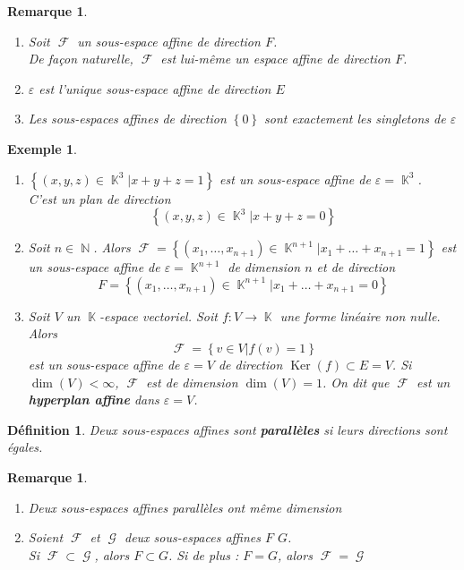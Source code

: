 \documentclass[a4paper, oneside]{report}
\theoremstyle{break}
\newtheorem{definition}[thm]{Définition}
\newtheorem{exemple}[thm]{Exemple}
\newtheorem{remarque}[thm]{Remarque}
\DeclareMathOperator{\N}{\mathbb{N}}
\DeclareMathOperator{\K}{\mathbb{K}}
\DeclareMathOperator{\F}{\mathcal{F}}
\DeclareMathOperator{\G}{\mathcal{G}}
\DeclarePairedDelimiter\ens{\left\{ }{\right\} }%
\DeclareMathOperator{\Ker}{Ker}
\renewcommand{\ens}[1]{\left\{ #1 \right\} }%
\newcommand{\slign}{\textbf}
\newcommand{\Ens}{\ens}
\newcommand{\ensF}{\F}
\newcommand{\ensG}{\G}
\begin{document}
\begin{remarque}
\begin{enumerate}
\item Soit $\ensF$ un sous-espace affine de direction $F$.\\
De façon naturelle, $\ensF$ est lui-même un espace affine de direction $F$.

\medbreak

\item $\varepsilon$ est l'unique sous-espace affine de direction $E$

\medbreak

\item  Les sous-espaces affines de direction $\ens{0}$ sont exactement les singletons de $\varepsilon$
\end{enumerate}
\end{remarque}

\begin{exemple}
\begin{enumerate}
\item  $\Ens{(x, y, z) \in \K^3 \big| x + y + z = 1}$ est un sous-espace affine de $\varepsilon = \K^3$.\\
C'est un plan de direction
\[
\Ens{(x, y, z) \in \K^3 \big| x + y + z = 0}
\]

\item  Soit $n \in \N$. Alors $\ensF = \Ens{(x_1, \ldots, x_{n+1}) \in \K^{n+1} \big| x_1 + \ldots + x_{n+1} = 1}$ est un sous-espace affine de $\varepsilon = \K^{n+1}$ de dimension $n$ et de direction
\[
F = \Ens{(x_1, \ldots, x_{n+1}) \in \K^{n+1} \big| x_1 + \ldots + x_{n+1} = 0}
\]

\item  Soit $V$ un $\K$-espace vectoriel. Soit $f : V \longrightarrow \K$ une forme linéaire non nulle. Alors
\[
\ensF = \Ens{v \in V \big| f(v) = 1}
\]
est un sous-espace affine de $\varepsilon = V$ de direction $\Ker(f) \subset E = V$. Si $\dim(V) < \infty$, $\ensF$ est de dimension $\dim(V) = 1$. On dit que $\ensF$ est un \slign{hyperplan affine} dans $\varepsilon = V$.

\end{enumerate}
\end{exemple}

\begin{definition}
Deux sous-espaces affines sont \slign{parallèles} si leurs directions sont égales.
\end{definition}

\begin{remarque}
\begin{enumerate}
\item  Deux sous-espaces affines parallèles ont même dimension

\medbreak

\item  Soient $\ensF$ et $\ensG$ deux sous-espaces affines $F$ $G$.\\
Si $\ensF \subset \ensG$, alors $F \subset G$. Si de plus : $F = G$, alors $\ensF = \ensG$

\end{enumerate}
\end{remarque}
\end{document}

